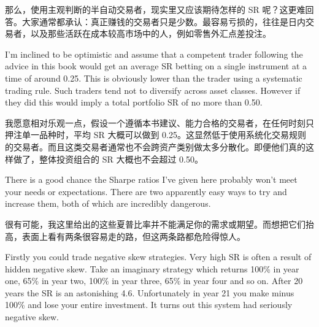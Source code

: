 \begin{chineseblock}那么，使用主观判断的半自动交易者，现实里又应该期待怎样的 SR 呢？这更难回答。大家通常都承认：真正赚钱的交易者只是少数。最容易亏损的，往往是日内交易者，以及那些活跃在成本较高市场中的人，例如零售外汇点差投注。\end{chineseblock}

\bipairgap

\begin{englishblock} I'm inclined to be optimistic and assume that a competent trader following the advice in this book would get an average SR betting on a single instrument at a time of around 0.25. This is obviously lower than the trader using a systematic trading rule. Such traders tend not to diversify across asset classes. However if they did this would imply a total portfolio SR of no more than 0.50. \end{englishblock}

\begin{chineseblock}我愿意相对乐观一点，假设一个遵循本书建议、能力合格的交易者，在任何时刻只押注单一品种时，平均 SR 大概可以做到 0.25。这显然低于使用系统化交易规则的交易者。而且这类交易者通常也不会跨资产类别做太多分散化。即便他们真的这样做了，整体投资组合的 SR 大概也不会超过 0.50。 \end{chineseblock}

\bipairgap

\begin{englishblock} There is a good chance the Sharpe ratios I've given here probably won't meet your needs or expectations. There are two apparently easy ways to try and increase them, both of which are incredibly dangerous. \end{englishblock}

\begin{chineseblock}很有可能，我这里给出的这些夏普比率并不能满足你的需求或期望。而想把它们抬高，表面上看有两条很容易走的路，但这两条路都危险得惊人。\end{chineseblock}

\bipairgap

\begin{englishblock} Firstly you could trade negative skew strategies. Very high SR is often a result of hidden negative skew. Take an imaginary strategy which returns 100\% in year one, 65\% in year two, 100\% in year three, 65\% in year four and so on. After 20 years the SR is an astonishing 4.6. Unfortunately in year 21 you make minus 100\% and lose your entire investment. It turns out this system had seriously negative skew. \end{englishblock}

